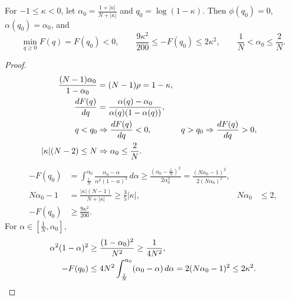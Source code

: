 \begin{lemma}
\label{lem:barrier}
For $-1\le \kappa<0$, let $\alpha_0=\tfrac{1+|\kappa|}{N+|\kappa|}$ and $q_0=\log(1-\kappa)$.
Then $\phi(q_0)=0$, $\alpha(q_0)=\alpha_0$, and
\begin{equation}
 \min_{q\ge0}F(q)=F(q_0)<0,\qquad
 \frac{9\kappa^2}{200}\le -F(q_0)\le2\kappa^2,\qquad
 \frac{1}{N}<\alpha_0\le\frac{2}{N}.
 \label{eq:barrier-bounds}
\end{equation}
\end{lemma}
\begin{proof}
\begin{align*}
 \frac{(N-1)\alpha_0}{1-\alpha_0}&=(N-1)\rho=1-\kappa,\\
 \dv{F(q)}{q}&=\frac{\alpha(q)-\alpha_0}{\alpha(q)(1-\alpha(q))},\\
 q<q_0&\Rightarrow \dv{F(q)}{q}<0,&q>q_0&\Rightarrow \dv{F(q)}{q}>0,\\
 |\kappa|(N-2)\le N&\Rightarrow \alpha_0\le\frac{2}{N}.
\end{align*}
\begin{align*}
 -F(q_0)
 &=\int_{\frac{1}{N}}^{\alpha_0}\frac{\alpha_0-\alpha}{\alpha^2(1-\alpha)^2}\,d\alpha
 \ge\frac{(\alpha_0-\frac{1}{N})^2}{2\alpha_0^2}
 =\frac{(N \alpha_0-1)^2}{2(N \alpha_0)^2},\\
 N \alpha_0-1&=\frac{|\kappa|(N-1)}{N+|\kappa|}\ge\frac{3}{5}|\kappa|,&N \alpha_0&\le2,\\
 -F(q_0)&\ge\frac{9\kappa^2}{200}.
\end{align*}
For $\alpha\in[\tfrac{1}{N},\alpha_0]$,
\begin{align*}
 \alpha^2(1-\alpha)^2&\ge\frac{(1-\alpha_0)^2}{N^2}\ge\frac{1}{4N^2},\\
 -F(q_0)&\le4N^2\int_{\frac{1}{N}}^{\alpha_0}(\alpha_0-\alpha)\,d\alpha
 =2(N \alpha_0-1)^2\le2\kappa^2.\qedhere
\end{align*}
\end{proof}

